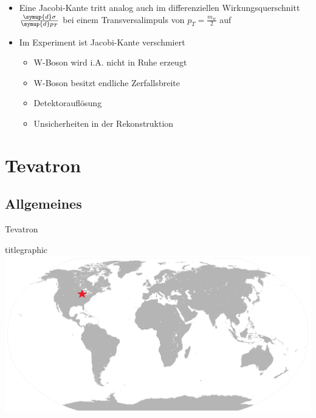 \documentclass[aspectratio=1610, 9pt]{beamer}
\begin{document}
\begin{frame}
  \begin{itemize}
    \item Eine Jacobi-Kante tritt analog auch im differenziellen Wirkungsquerschnitt $\frac{\symup{d} \sigma}{\symup{d} p_T}$ bei einem Transversalimpuls von $p_T = \frac{m_w}{2}$ auf
    \item Im Experiment ist Jacobi-Kante verschmiert
    \begin{itemize}
      \item[\rightarrow] W-Boson wird i.A. nicht in Ruhe erzeugt
      \item[\rightarrow] W-Boson besitzt endliche Zerfallsbreite
      \item[\rightarrow] Detektorauflösung
      \item[\rightarrow] Unsicherheiten in der Rekonstruktion
    \end{itemize}
  \end{itemize}
\end{frame}

\section{Tevatron}

\subsection{Allgemeines}

\begin{frame}{Tevatron}
  \begin{beamercolorbox}[center, wd=\textwidth]{titlegraphic}
    \includegraphics[width=\textwidth]{images/map.png}
  \end{beamercolorbox}%
\end{frame}
\end{document}
